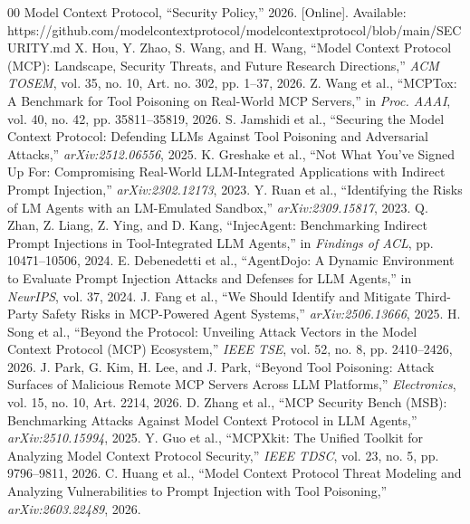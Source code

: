 \documentclass[conference]{IEEEtran}
\begin{document}
\begin{thebibliography}{00}
 Model Context Protocol, ``Security Policy,'' 2026. [Online]. Available: https://github.com/modelcontextprotocol/modelcontextprotocol/blob/main/SECURITY.md
 X. Hou, Y. Zhao, S. Wang, and H. Wang, ``Model Context Protocol (MCP): Landscape, Security Threats, and Future Research Directions,'' \textit{ACM TOSEM}, vol. 35, no. 10, Art. no. 302, pp. 1--37, 2026.
 Z. Wang et al., ``MCPTox: A Benchmark for Tool Poisoning on Real-World MCP Servers,'' in \textit{Proc. AAAI}, vol. 40, no. 42, pp. 35811--35819, 2026.
 S. Jamshidi et al., ``Securing the Model Context Protocol: Defending LLMs Against Tool Poisoning and Adversarial Attacks,'' \textit{arXiv:2512.06556}, 2025.
 K. Greshake et al., ``Not What You've Signed Up For: Compromising Real-World LLM-Integrated Applications with Indirect Prompt Injection,'' \textit{arXiv:2302.12173}, 2023.
 Y. Ruan et al., ``Identifying the Risks of LM Agents with an LM-Emulated Sandbox,'' \textit{arXiv:2309.15817}, 2023.
 Q. Zhan, Z. Liang, Z. Ying, and D. Kang, ``InjecAgent: Benchmarking Indirect Prompt Injections in Tool-Integrated LLM Agents,'' in \textit{Findings of ACL}, pp. 10471--10506, 2024.
 E. Debenedetti et al., ``AgentDojo: A Dynamic Environment to Evaluate Prompt Injection Attacks and Defenses for LLM Agents,'' in \textit{NeurIPS}, vol. 37, 2024.
 J. Fang et al., ``We Should Identify and Mitigate Third-Party Safety Risks in MCP-Powered Agent Systems,'' \textit{arXiv:2506.13666}, 2025.
 H. Song et al., ``Beyond the Protocol: Unveiling Attack Vectors in the Model Context Protocol (MCP) Ecosystem,'' \textit{IEEE TSE}, vol. 52, no. 8, pp. 2410--2426, 2026.
 J. Park, G. Kim, H. Lee, and J. Park, ``Beyond Tool Poisoning: Attack Surfaces of Malicious Remote MCP Servers Across LLM Platforms,'' \textit{Electronics}, vol. 15, no. 10, Art. 2214, 2026.
 D. Zhang et al., ``MCP Security Bench (MSB): Benchmarking Attacks Against Model Context Protocol in LLM Agents,'' \textit{arXiv:2510.15994}, 2025.
 Y. Guo et al., ``MCPXkit: The Unified Toolkit for Analyzing Model Context Protocol Security,'' \textit{IEEE TDSC}, vol. 23, no. 5, pp. 9796--9811, 2026.
 C. Huang et al., ``Model Context Protocol Threat Modeling and Analyzing Vulnerabilities to Prompt Injection with Tool Poisoning,'' \textit{arXiv:2603.22489}, 2026.

\end{thebibliography}
\end{document}
